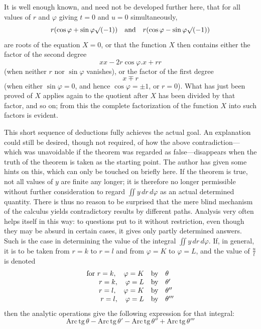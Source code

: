 It is well enough known, and need not be developed further here, that for all values of $r$ and $\varphi$ giving $t=0$ and $u=0$ simultaneously,
\[
r(\cos\varphi+\sin\varphi\surd(-1))\quad\hbox{and}\quad
r(\cos\varphi-\sin\varphi\surd(-1))
\]
are roots of the equation $X=0$, or that the function $X$ then contains either the factor of the second degree
\[
xx-2r\cos\varphi.x+rr
\]
(when neither $r$ nor $\sin\varphi$ vanishes), or the factor of the first degree
\[
x\mp r
\]
(when either $\sin\varphi=0$, and hence $\cos\varphi=\pm1$, or $r=0$). What has just been proved of $X$ applies again to the quotient after $X$ has been divided by that factor, and so on; from this the complete factorization of the function $X$ into such factors is evident.

This short sequence of deductions fully achieves the actual goal. An explanation could still be desired, though not required, of how the above contradiction---which was unavoidable if the theorem was regarded as false---disappears when the truth of the theorem is taken as the starting point. The author has given some hints on this, which can only be touched on briefly here. If the theorem is true, not all values of $y$ are finite any longer; it is therefore no longer permissible without further consideration to regard $\iint y\,dr\,d\varphi$ as an actual determined quantity. There is thus no reason to be surprised that the mere blind mechanism of the calculus yields contradictory results by different paths. Analysis very often helps itself in this way: to questions put to it without restriction, even though they may be absurd in certain cases, it gives only partly determined answers. Such is the case in determining the value of the integral $\iint y\,dr\,d\varphi$. If, in general, it is to be taken from $r=k$ to $r=l$ and from $\varphi=K$ to $\varphi=L$, and the value of $\frac{u}{t}$ is denoted
\[
\begin{array}{rcl}
\hbox{for }r=k,\quad\varphi=K&\hbox{by}&\theta\\
r=k,\quad\varphi=L&\hbox{by}&\theta'\\
r=l,\quad\varphi=K&\hbox{by}&\theta''\\
r=l,\quad\varphi=L&\hbox{by}&\theta'''
\end{array}
\]
then the analytic operations give the following expression for that integral:
\[
\mathrm{Arc\,tg}\,\theta-\mathrm{Arc\,tg}\,\theta'
-\mathrm{Arc\,tg}\,\theta''+\mathrm{Arc\,tg}\,\theta'''
\]

